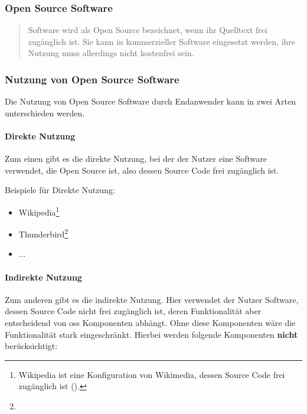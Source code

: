 \documentclass[a4paper]{article}
\begin{document}
            \subsubsection{Open Source Software}
                \begin{quote} 
                    \centering 
                    Software wird als Open Source bezeichnet, wenn ihr Quelltext frei zugänglich ist. Sie kann in kommerzieller Software eingesetzt werden, ihre Nutzung muss allerdings nicht kostenfrei sein. 
                \end{quote}
                
            \subsubsection{Nutzung von Open Source Software}
                Die Nutzung von Open Source Software durch Endanwender kann in zwei Arten unterschieden werden.
                
                \paragraph{Direkte Nutzung}
                    Zum einen gibt es die direkte Nutzung, bei der der Nutzer eine Software verwendet, die Open Source ist, also dessen Source Code frei zugänglich ist.
                    
                    Beispiele für Direkte Nutzung:
                    \begin{itemize}
                        \item Wikipedia\footnote{Wikipedia ist eine Konfiguration von Wikimedia, dessen Source Code frei zugänglich ist ().}
                        \item Thunderbird\footnote{}
                        \item ... %
                    \end{itemize}
                    
                \paragraph{Indirekte Nutzung}
                    Zum anderen gibt es die indirekte Nutzung. Hier verwendet der Nutzer Software, dessen Source Code nicht frei zugänglich ist, deren Funktionalität aber entscheidend von \gls{oss} Komponenten abhängt. Ohne diese Komponenten wäre die Funktionalität stark eingeschränkt. Hierbei werden folgende Komponenten \textbf{nicht} berücksichtigt:
                    
\end{document}
